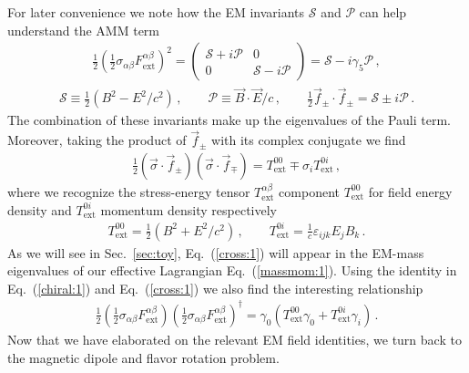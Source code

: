 \documentclass[addchapnum]{ws-rv961x669} %
\newcommand{\req}[1]{Eq.~(\ref{#1})}
\newcommand{\rsec}[1]{Sec.~{\ref{#1}}}
\begin{document}
For later convenience we note how the EM invariants $\mathcal{S}$ and $\mathcal{P}$ can help understand the AMM term 
\begin{align}
\label{invar:1}
\frac{1}{2}\left(\frac{1}{2}\sigma_{\alpha\beta}F^{\alpha\beta}_\mathrm{ext}\right)^{2}=
\begin{pmatrix}
\mathcal{S}+i\mathcal{P} & 0\\
0 & \mathcal{S}-i\mathcal{P}
\end{pmatrix}=\mathcal{S}-i\gamma_{5}\mathcal{P}\,,
\end{align}
%
\begin{align}
\mathcal{S}\equiv\frac{1}{2}\left(B^{2}-E^{2}/c^{2}\right)\,,\qquad
\mathcal{P}\equiv\vec{B}\cdot\vec{E}/c\,,\qquad
\frac{1}{2}\vec{f}_{\pm}\cdot\vec{f}_{\pm}=\mathcal{S}\pm i\mathcal{P}\,.
\end{align}
The combination of these invariants make up the eigenvalues of the Pauli term. Moreover, taking the product of $\vec{f}_{\pm}$ with its complex conjugate we find
\begin{align}
\label{cross:1}
\frac{1}{2}\left(\vec{\sigma}\cdot\vec{f}_{\pm}\right)\left(\vec{\sigma}\cdot\vec{f}_{\mp}\right)=T_\mathrm{ext}^{00}\mp \sigma_{i}T_\mathrm{ext}^{0i}\,,
\end{align}
where we recognize the stress-energy tensor $T_\mathrm{ext}^{\alpha\beta}$ component $T_\mathrm{ext}^{00}$ for field energy density and $T_\mathrm{ext}^{0i}$ momentum density respectively
\begin{align}
T_\mathrm{ext}^{00}=\frac{1}{2}\left(B^{2}+E^{2}/c^{2}\right)\,,\qquad
T_\mathrm{ext}^{0i}=\frac{1}{c}\varepsilon_{ijk}E_{j}B_{k}\,.
\end{align}
As we will see in \rsec{sec:toy}, \req{cross:1} will appear in the EM-mass eigenvalues of our effective Lagrangian \req{massmom:1}. Using the identity in \req{chiral:1} and \req{cross:1} we also find the interesting relationship
\begin{align}
\label{cross:2}
\frac{1}{2}\left(\frac{1}{2}\sigma_{\alpha\beta}F^{\alpha\beta}_\mathrm{ext}\right)\left(\frac{1}{2}\sigma_{\alpha\beta}F^{\alpha\beta}_\mathrm{ext}\right)^{\dag}=
\gamma_{0}\left(T_\mathrm{ext}^{00}\gamma_{0}+T_\mathrm{ext}^{0i}\gamma_{i}\right)\,.
\end{align}
Now that we have elaborated on the relevant EM field identities, we turn back to the magnetic dipole and flavor rotation problem.

\end{document}
